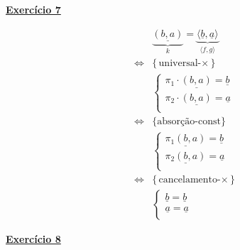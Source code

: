 \documentclass[a4paper,11pt]{article}
\begin{document}
	
	\noindent \underline{\textbf{Exercício 7}}
	\begin{center}
		\begin{minipage}{0.4\textwidth}
			\begin{mdframed}
				\[
				\begin{aligned}
					&\underbrace{\underline{(b, a)}}_{k} = \underbrace{\langle \underline{b}, \underline{a} \rangle}_{\langle f, g \rangle} \\
					\iff &\{\text{universal-$\times$}\} \\
					&\begin{cases}
						\pi_1 \cdot \underline{(b, a)} = \underline{b} \\
						\pi_2 \cdot \underline{(b, a)} = \underline{a} \\
					\end{cases}\\
					\iff &\{\text{absorção-const}\} \\
					&\begin{cases}
						\underline{\pi_1 (b, a)} = \underline{b} \\
						\underline{\pi_2 (b, a)} = \underline{a} \\
					\end{cases}\\
					\iff &\{\text{cancelamento-$\times$}\} \\
					&\begin{cases}
						\underline{b} = \underline{b} \\
						\underline{a} = \underline{a} \\
					\end{cases}
				\end{aligned}
				\]
			\end{mdframed}
		\end{minipage}
	\end{center}
	
	
	\noindent \underline{\textbf{Exercício 8}}
	\\
	
\end{document}
